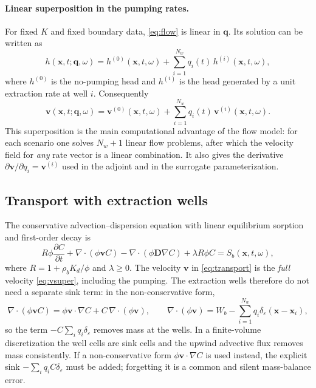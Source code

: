 \documentclass[11pt]{article}
\numberwithin{equation}{section}
\newcommand{\pdd}[2]{\frac{\partial #1}{\partial #2}}
\newcommand{\xx}{\mathbf{x}}
\newcommand{\vv}{\mathbf{v}}
\newcommand{\DD}{\mathbf{D}}
\theoremstyle{plain}
\begin{document}
\paragraph{Linear superposition in the pumping rates.}
For fixed $K$ and fixed boundary data, \eqref{eq:flow} is linear in
$\mathbf{q}$.  Its solution can be written as
\begin{equation}
\label{eq:superposition}
h(\xx,t;\mathbf{q},\omega)
=h^{(0)}(\xx,t,\omega)
+\sum_{i=1}^{N_w} q_i(t)\,h^{(i)}(\xx,t,\omega),
\end{equation}
where $h^{(0)}$ is the no-pumping head and $h^{(i)}$ is the head generated by
a unit extraction rate at well $i$.  Consequently
\begin{equation}
\label{eq:vsuper}
\vv(\xx,t;\mathbf{q},\omega)
=\vv^{(0)}(\xx,t,\omega)
+\sum_{i=1}^{N_w} q_i(t)\,\vv^{(i)}(\xx,t,\omega).
\end{equation}
This superposition is the main computational advantage of the flow model: for
each scenario one solves $N_w+1$ linear flow problems, after which the
velocity field for \emph{any} rate vector is a linear combination.  It also
gives the derivative $\partial\vv/\partial q_i=\vv^{(i)}$ used in the adjoint
and in the surrogate parameterization.

\subsection{Transport with extraction wells}
\label{sec:transport}

The conservative advection--dispersion equation with linear equilibrium
sorption and first-order decay is
\begin{equation}
\label{eq:transport}
R\phi\pdd{C}{t}
+\nabla\cdot(\phi\vv C)
-\nabla\cdot(\phi\DD\nabla C)
+\lambda R\phi C
=S_b(\xx,t,\omega),
\end{equation}
where $R=1+\rho_bK_d/\phi$ and $\lambda\ge0$.  The velocity $\vv$ in
\eqref{eq:transport} is the \emph{full} velocity \eqref{eq:vsuper}, including
the pumping.  The extraction wells therefore do not need a separate sink term:
in the non-conservative form,
\begin{equation}
\label{eq:divv}
\nabla\cdot(\phi\vv C)
=\phi\vv\cdot\nabla C
+C\,\nabla\cdot(\phi\vv),
\qquad
\nabla\cdot(\phi\vv)
=W_b-\sum_{i=1}^{N_w}q_i\delta_{\varepsilon}(\xx-\xx_i),
\end{equation}
so the term $-C\sum_i q_i\delta_{\varepsilon}$ removes mass at the wells.  In
a finite-volume discretization the well cells are sink cells and the upwind
advective flux removes mass consistently.  If a non-conservative form
$\phi\vv\cdot\nabla C$ is used instead, the explicit sink
$-\sum_i q_i C\delta_{\varepsilon}$ must be added; forgetting it is a common
and silent mass-balance error.
\end{document}
